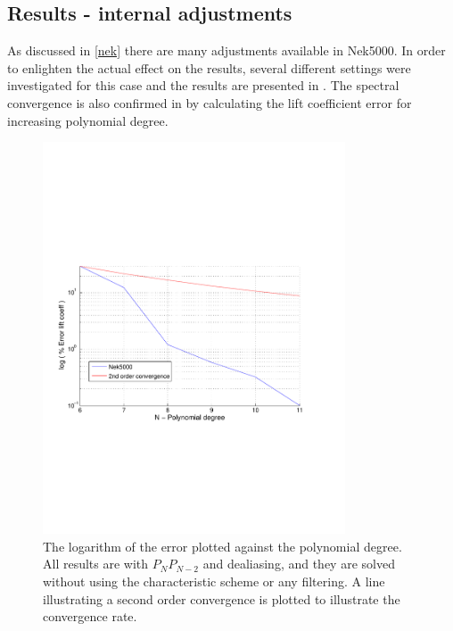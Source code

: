 \subsection{Results - internal adjustments }
As discussed in \cref{nek} there are many adjustments available in Nek5000. 
In order to enlighten the actual effect on the results, several different settings were 
investigated for this case and the results are presented in . 
The spectral convergence is also confirmed in  by calculating the 
lift coefficient error for increasing polynomial degree. 
%
\begin{figure}[h]
	\centerline{
        \includegraphics[trim=0.5cm 7cm 0.5cm 7cm, width=0.8\textwidth]{Figures/lift_coef2.pdf}}
	\caption{The logarithm of the error plotted against the polynomial degree. All results 
        are with $P_NP_{N-2}$ and dealiasing, and they are solved without using the 
    characteristic scheme or any filtering. A line illustrating a second order convergence is 
    plotted to illustrate the convergence rate.}
	\label{fig:liftconv}
\end{figure}
%

